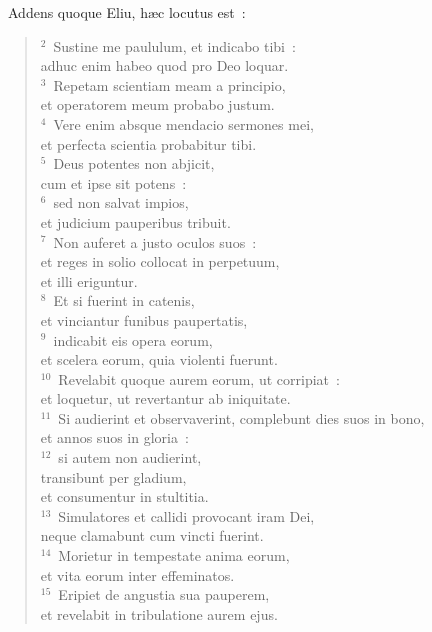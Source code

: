 ~\lettrine[lines=10,image=true,loversize=0.05,lraise=-0.03]{A}{}ddens quoque Eliu, h\ae c locutus est~:
\begin{flushleft}\begin{verse}\vspace{6pt}${}^{2}$~Sustine me paululum, et indicabo tibi~:\\ adhuc enim habeo quod pro Deo loquar.\\
${}^{3}$~Repetam scientiam meam a principio,\\ et operatorem meum probabo justum.\\
${}^{4}$~Vere enim absque mendacio sermones mei,\\ et perfecta scientia probabitur tibi.\\
${}^{5}$~Deus potentes non abjicit,\\ cum et ipse sit potens~:\\
${}^{6}$~sed non salvat impios,\\ et judicium pauperibus tribuit.\\
${}^{7}$~Non auferet a justo oculos suos~:\\ et reges in solio collocat in perpetuum,\\ et illi eriguntur.\\
${}^{8}$~Et si fuerint in catenis,\\ et vinciantur funibus paupertatis,\\
${}^{9}$~indicabit eis opera eorum,\\ et scelera eorum, quia violenti fuerunt.\\
${}^{10}$~Revelabit quoque aurem eorum, ut corripiat~:\\ et loquetur, ut revertantur ab iniquitate.\\
${}^{11}$~Si audierint et observaverint, complebunt dies suos in bono,\\ et annos suos in gloria~:\\
${}^{12}$~si autem non audierint,\\ transibunt per gladium,\\ et consumentur in stultitia.\\
${}^{13}$~Simulatores et callidi provocant iram Dei,\\ neque clamabunt cum vincti fuerint.\\
${}^{14}$~Morietur in tempestate anima eorum,\\ et vita eorum inter effeminatos.\\
${}^{15}$~Eripiet de angustia sua pauperem,\\ et revelabit in tribulatione aurem ejus.\\

\end{verse}
\end{flushleft}
